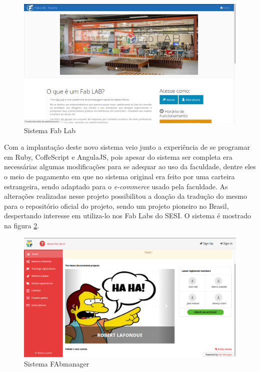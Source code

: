 \documentclass[
	12pt,				%
	oneside,			%
	a4paper,			%
	chapter=TITLE,		%
	section=TITLE,		%
	sumario=tradicional %
	english,			%
	french,				%
	spanish,			%
	brazil				%
	]{abntex2}
\begin{document}
\begin{figure}[htb]
	\caption{\label{fig:fablabsistema} Sistema Fab Lab}
	\begin{center}
		\includegraphics[scale=0.3]{fablabsistema}
	\end{center}
\end{figure}

Com a implantação deste novo sistema veio junto a experiência de se programar em Ruby, CoffeScript e AngulaJS, pois apesar do sistema ser completa era necessárias algumas modificações para se adequar ao uso da faculdade, dentre eles o meio de pagamento em que no sistema original era feito por uma carteira estrangeira, sendo adaptado para o \textit{e-commerce} usado pela faculdade. As alterações realizadas nesse projeto possibilitou a doação da tradução do mesmo para o repositório oficial do projeto, sendo um projeto pioneiro no Brasil, despertando interesse em utiliza-lo nos Fab Labs do SESI. O sistema é mostrado na figura \ref{fig:fabmanager}.

\begin{figure}[htb]
	\caption{\label{fig:fabmanager} Sistema FAbmanager}
	\begin{center}
		\includegraphics[scale=0.3]{fabmanager}
	\end{center}
\end{figure}
\end{document}
